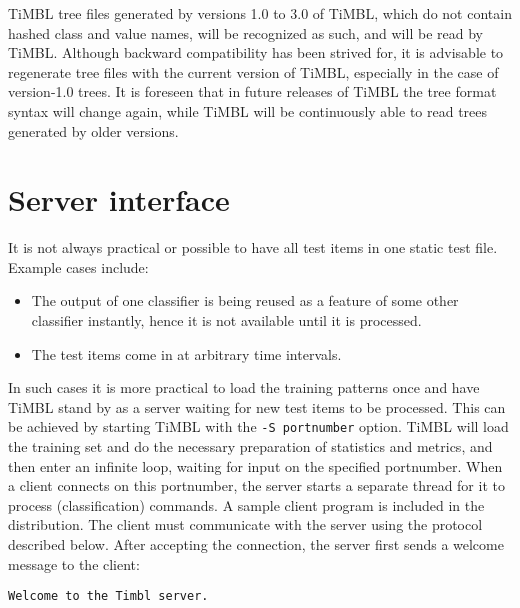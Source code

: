 \documentclass{report}
\begin{document}
TiMBL tree files generated by versions 1.0 to 3.0 of TiMBL, which do
not contain hashed class and value names, will be recognized as such,
and will be read by TiMBL. Although backward compatibility has been
strived for, it is advisable to regenerate tree files with the current
version of TiMBL, especially in the case of version-1.0 trees. It is
foreseen that in future releases of TiMBL the tree format syntax will
change again, while TiMBL will be continuously able to read trees
generated by older versions.

\section{Server interface}
\label{serverformat}

It is not always practical or possible to have all test items in one
static test file. Example cases include:

\begin{itemize}
\item The output of one classifier is being reused as a feature of
some other classifier instantly, hence it is not available until it is
processed.
\item The test items come in at arbitrary time intervals.
\end{itemize}

In such cases it is more practical to load the training patterns once
and have TiMBL stand by as a server waiting for new test items to be
processed. This can be achieved by starting TiMBL with the {\tt -S
portnumber} option. TiMBL will load the training set and do the
necessary preparation of statistics and metrics, and then enter an
infinite loop, waiting for input on the specified portnumber. When a
client connects on this portnumber, the server starts a separate
thread for it to process (classification) commands. A sample client
program is included in the distribution. The client must communicate
with the server using the protocol described below. After accepting
the connection, the server first sends a welcome message to the client:

{\tt Welcome to the Timbl server.}
\end{document}
